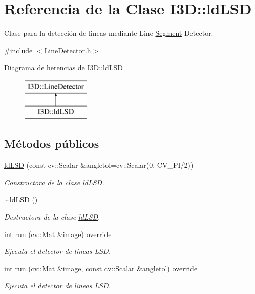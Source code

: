 \hypertarget{class_i3_d_1_1ld_l_s_d}{}\section{Referencia de la Clase I3D\+:\+:ld\+L\+SD}
\label{class_i3_d_1_1ld_l_s_d}


Clase para la detección de lineas mediante Line \hyperlink{class_i3_d_1_1_segment}{Segment} Detector.  




{\ttfamily \#include $<$Line\+Detector.\+h$>$}

Diagrama de herencias de I3D\+:\+:ld\+L\+SD\begin{figure}[H]
\begin{center}
\leavevmode
\includegraphics[height=2.000000cm]{class_i3_d_1_1ld_l_s_d}
\end{center}
\end{figure}
\subsection*{Métodos públicos}
\begin{DoxyCompactItemize}
\item 
\hyperlink{class_i3_d_1_1ld_l_s_d_a3f2eba9f10daaeab35a1adc7f628c11a}{ld\+L\+SD} (const cv\+::\+Scalar \&angletol=cv\+::\+Scalar(0, C\+V\+\_\+\+PI/2))
\begin{DoxyCompactList}\small\item\em Constructora de la clase \hyperlink{class_i3_d_1_1ld_l_s_d}{ld\+L\+SD}. \end{DoxyCompactList}\item 
\hyperlink{class_i3_d_1_1ld_l_s_d_aea5de322f9c8a8f6ab09ff477e9ab340}{$\sim$ld\+L\+SD} ()
\begin{DoxyCompactList}\small\item\em Destructora de la clase \hyperlink{class_i3_d_1_1ld_l_s_d}{ld\+L\+SD}. \end{DoxyCompactList}\item 
int \hyperlink{class_i3_d_1_1ld_l_s_d_a451a9385fb8abf87d6c462321518c439}{run} (cv\+::\+Mat \&image) override
\begin{DoxyCompactList}\small\item\em Ejecuta el detector de lineas L\+SD. \end{DoxyCompactList}\item 
int \hyperlink{class_i3_d_1_1ld_l_s_d_ab688b28c6cd6e0915404baf9329415d8}{run} (cv\+::\+Mat \&image, const cv\+::\+Scalar \&angletol) override
\begin{DoxyCompactList}\small\item\em Ejecuta el detector de lineas L\+SD. \end{DoxyCompactList}\end{DoxyCompactItemize}
